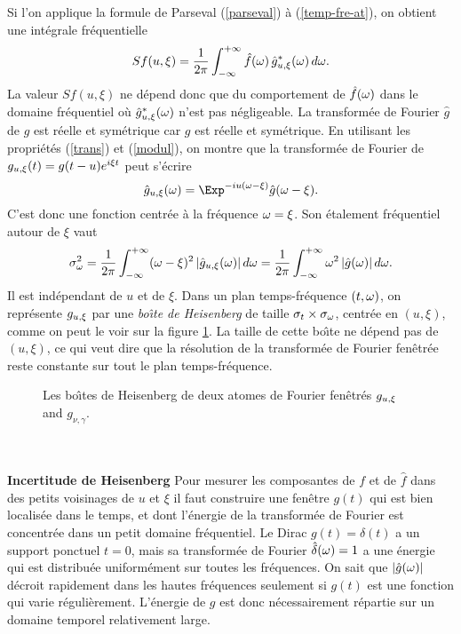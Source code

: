 Si l'on applique la formule de Parseval (\ref{parseval})
\`a (\ref{temp-fre-at}), on obtient une int\'egrale fr\'equentielle
\[
Sf(u,\xi) = \frac 1 {2 \pi} 
\int_{-\infty}^{+\infty} \hat f({\omega}) \,\hat g_{u,\xi}^* ({\omega})\, d{\omega} .
\]
La valeur $Sf(u,\xi)$
ne d\'epend donc que du comportement de $\hat f ({\omega})$ dans
le domaine fr\'equentiel o\`u $\hat g_{u,\xi}^* ({\omega})$ n'est pas
n\'egligeable.
La transform\'{e}e de Fourier $\hat g$ de $g$ est r\'{e}elle et 
sym\'{e}trique car $g$ est r\'{e}elle et sym\'{e}trique. 
En utilisant les propri\'et\'es (\ref{trans}) et (\ref{modul}),
on montre que
la transform\'ee de Fourier de $g_{u,\xi} (t) = g(t-u) e^{i\xi t}$
peut s'\'ecrire
\[
\hat g_\uxi (\om) = \Exp^{-iu(\om-\xi)} \hat g(\om - \xi) .
\] 
C'est donc une fonction centr\'ee \`a la fr\'equence ${\omega} = \xi$.
Son \'{e}talement fr\'{e}quentiel autour de $\xi$ vaut
\begin{equation}
\label{sigma-om}
\sigma^2_{\omega} = \frac 1 {2 \pi}
\int_{-\infty}^{+\infty} ({\omega}-\xi) ^2\, |\hat g_{u,\xi} ({\omega})|\, d{\omega} = 
\frac 1 {2 \pi} \int_{-\infty}^{+\infty} {\omega} ^2\, |\hat g({\omega})|\, d{\omega} .
\end{equation}
Il est ind\'{e}pendant de $u$ et de $\xi$. 
Dans un plan temps-fr\'equence $(t,{\omega})$, 
on repr\'esente $g_{{u,\xi}}$ par une 
{\it bo\^{\i}te de Heisenberg} 
de taille $\sigma_t \times \sigma_{\omega}$, 
centr\'{e}e en $(u,\xi)$, comme on peut le voir sur la figure 
\ref{4.2}. 
La taille de cette bo\^{\i}te ne d\'{e}pend pas de $(u,\xi)$, 
ce qui veut dire que la r\'{e}solution de la transform\'{e}e de 
Fourier fen\^{e}tr\'{e}e reste constante sur tout le plan 
temps-fr\'{e}quence.

\begin{figure}[bhtp]
\centerline{
        \epsfxsize=6cm
        \leavevmode{}}
\caption{
Les bo\^{\i}tes de Heisenberg de deux atomes de Fourier fen\^{e}tr\'{e}s
$g_{u,\xi}$ and $g_{\nu,\gamma}$.}
\label{4.2}
\end{figure}
\\
\\
\noindent
{\bf Incertitude de Heisenberg}
Pour mesurer les composantes de $f$ et de $\hat f$ dans
des petits voisinages de $u$ et $\xi$ il faut construire
une fen\^etre $g(t)$ qui est 
bien localis\'{e}e dans le temps, et dont l'\'{e}nergie de la 
transform\'{e}e de Fourier est concentr\'{e}e dans un petit domaine 
fr\'{e}quentiel. 
Le Dirac $g(t) = \delta(t)$ a un support ponctuel $t=0$, 
mais sa transform\'{e}e de Fourier  $\hat \delta ({\omega}) = 1$ a une 
\'{e}nergie qui est distribu\'{e}e uniform\'{e}ment sur toutes les 
fr\'{e}quences. On sait que $|\hat g({\omega})|$ d\'{e}croit rapidement 
dans les hautes fr\'{e}quences seulement si $g(t)$ est une
fonction qui varie r\'eguli\`erement.
L'\'{e}nergie de $g$ est donc n\'ecessairement 
r\'{e}partie sur un domaine temporel relativement large.

